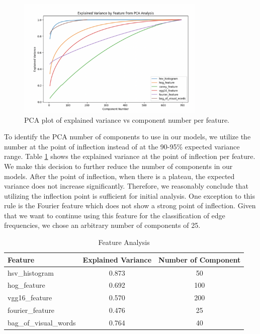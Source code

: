 \documentclass[11pt]{article}
\begin{document}
\begin{figure}[h]
\centering
\includegraphics[width=0.8\textwidth]{PCA.png}
\caption{PCA plot of explained variance vs component number per feature. }
\label{fig:PCA}
\end{figure}

To identify the PCA number of components to use in our models, we utilize the number at the point of inflection instead of at the 90-95\% expected variance range. Table \ref{table:PCA} shows the explained variance at the point of inflection per feature. We make this decision to further reduce the number of components in our models. After the point of inflection, when there is a plateau, the expected variance does not increase significantly. Therefore, we reasonably conclude that utilizing the inflection point is sufficient for initial analysis. One exception to this rule is the Fourier feature which does not show a strong point of inflection. Given that we want to continue using this feature for the classification of edge frequencies, we chose an arbitrary number of components of 25. 

\begin{table}[h!]
    \centering
    \begin{tabular}{|l|c|c|}
        \hline
        \textbf{Feature} & \textbf{Explained Variance} & \textbf{Number of Component} \\
        \hline
        hsv\_histogram & 0.873 & 50 \\
        \hline
        hog\_feature & 0.692 & 100 \\
        \hline
        vgg16\_feature & 0.570 & 200 \\
        \hline
        fourier\_feature & 0.476 & 25 \\
        \hline
        bag\_of\_visual\_words & 0.764 & 40 \\
        \hline
    \end{tabular}
    \caption{Feature Analysis}
    \label{table:PCA}
\end{table}
\end{document}
